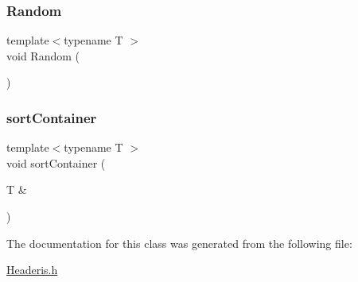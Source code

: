 \subsubsection{\texorpdfstring{Random}{Random}}
{\footnotesize\ttfamily template$<$typename T $>$ \\
void Random (\begin{DoxyParamCaption}{ }\end{DoxyParamCaption})\hspace{0.3cm}{\ttfamily [friend]}}

\mbox{\label{class_mokiniai_a094a3acbb560126e8bb80b657d0e2a1b}} 
\subsubsection{\texorpdfstring{sort\+Container}{sortContainer}}
{\footnotesize\ttfamily template$<$typename T $>$ \\
void sort\+Container (\begin{DoxyParamCaption}\item[{T \&}]{ }\end{DoxyParamCaption})\hspace{0.3cm}{\ttfamily [friend]}}



The documentation for this class was generated from the following file\+:\begin{DoxyCompactItemize}
\item 
\mbox{\hyperlink{_headeris_8h}{Headeris.\+h}}\end{DoxyCompactItemize}
